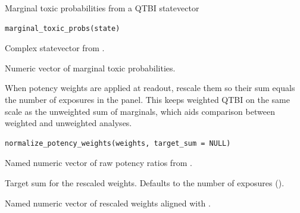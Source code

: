 \documentclass[a4paper]{book}
\begin{document}
%
\begin{Description}
Marginal toxic probabilities from a QTBI statevector
\end{Description}
%
\begin{Usage}
\begin{verbatim}
marginal_toxic_probs(state)
\end{verbatim}
\end{Usage}
%
\begin{Arguments}
\begin{ldescription}
\item[\code{state}] Complex statevector from .
\end{ldescription}
\end{Arguments}
%
\begin{Value}
Numeric vector of marginal toxic probabilities.
\end{Value}
%
\begin{Description}
When potency weights are applied at readout, rescale them so their sum equals
the number of exposures in the panel. This keeps weighted QTBI on the same
\eqn{[0, n]}{} scale as the unweighted sum of marginals, which aids comparison
between weighted and unweighted analyses.
\end{Description}
%
\begin{Usage}
\begin{verbatim}
normalize_potency_weights(weights, target_sum = NULL)
\end{verbatim}
\end{Usage}
%
\begin{Arguments}
\begin{ldescription}
\item[\code{weights}] Named numeric vector of raw potency ratios from
.

\item[\code{target\_sum}] Target sum for the rescaled weights. Defaults to the
number of exposures ().
\end{ldescription}
\end{Arguments}
%
\begin{Value}
Named numeric vector of rescaled weights aligned with .
\end{Value}
\end{document}
